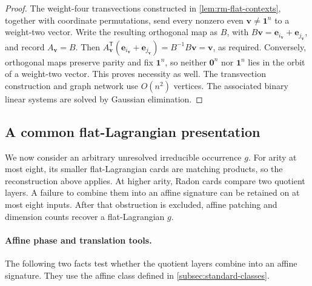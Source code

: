 \documentclass[11pt,letterpaper,onecolumn]{article}
\theoremstyle{plain}
\theoremstyle{definition}
\theoremstyle{remark}
\newcommand{\one}{\mathbf 1}
\newcommand{\zero}{\mathbf 0}
\begin{document}
\begin{proof}
The weight-four transvections constructed in
\cref{lem:rm-flat-contexts}, together with coordinate permutations, send
every nonzero even \({\mathbf{v}}\ne\one^n\) to a weight-two vector.  Write the
resulting orthogonal map as \(B\), with \(B{\mathbf{v}}={\mathbf{e}}_{i_{\mathbf{v}}}+{\mathbf{e}}_{j_{\mathbf{v}}}\), and
record \(A_{\mathbf{v}}=B\).  Then
\(A_{\mathbf{v}}^{\mathsf T}({\mathbf{e}}_{i_{\mathbf{v}}}+{\mathbf{e}}_{j_{\mathbf{v}}})=B^{-1}B{\mathbf{v}}={\mathbf{v}}\), as required.  Conversely, orthogonal maps preserve parity and fix
\(\one^n\), so neither \(\zero^n\) nor \(\one^n\) lies in the orbit of a
weight-two vector.  This proves necessity as well.  The transvection
construction and graph network use \(O(n^2)\) vertices. The associated
binary linear systems are solved by Gaussian elimination.
\end{proof}

\subsection{A common flat-Lagrangian presentation}

We now consider an arbitrary unresolved irreducible occurrence \(g\).
For arity at most eight, its smaller flat-Lagrangian cards are matching products, so
the reconstruction above applies.  At higher arity, Radon cards compare
two quotient layers.  A failure to combine them into an affine signature
can be retained on at most eight inputs. After that obstruction is excluded,
affine patching and dimension counts recover a flat-Lagrangian \(g\).

\paragraph{Affine phase and translation tools.}
\label{subsubsec:rm-affine-phase-tools}

The following two facts test whether the quotient layers combine into an
affine signature.  They use the affine class defined in
\cref{subsec:standard-classes}.
\end{document}
